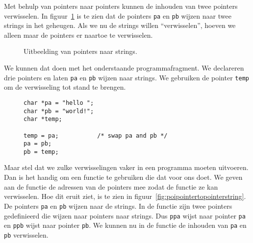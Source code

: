 Met behulp van pointers naar pointers kunnen de inhouden van twee pointers verwisselen. In figuur~\ref{fig:poipointertostring} is te zien dat de pointers \texttt{pa} en \texttt{pb} wijzen naar twee strings in het geheugen. Als we nu de strings willen ``verwisselen'', hoeven we alleen maar de pointers er naartoe te verwisselen.

\begin{figure}[!ht]
\centering
{}
\caption{Uitbeelding van pointers naar strings.}
\label{fig:poipointertostring}
\end{figure}

We kunnen dat doen met het onderstaande programmafragment. We declareren drie pointers en laten \texttt{pa} en \texttt{pb} wijzen naar strings. We gebruiken de pointer \texttt{temp} om de verwisseling tot stand te brengen.

\begin{figure}[H]
\begin{lstlisting}[caption=Verwisselen van twee pointers.]
char *pa = "hello ";
char *pb = "world!";
char *temp;

temp = pa;           /* swap pa and pb */
pa = pb;
pb = temp;
\end{lstlisting}
\end{figure}

Maar stel dat we zulke verwisselingen vaker in een programma moeten uitvoeren. Dan is het handig om een functie te gebruiken die dat voor ons doet. We geven aan de functie de adressen van de pointers mee zodat de functie ze kan verwisselen. Hoe dit eruit ziet, is te zien in figuur~\ref{fig:poipointertopointerstring}. De pointers \texttt{pa} en \texttt{pb} wijzen naar de strings. In de functie zijn twee pointers gedefinieerd die wijzen naar pointers naar strings. Dus \texttt{ppa} wijst naar pointer \texttt{pa} en \texttt{ppb} wijst naar pointer \texttt{pb}. We kunnen nu in de functie de inhouden van \texttt{pa} en \texttt{pb} verwisselen.

